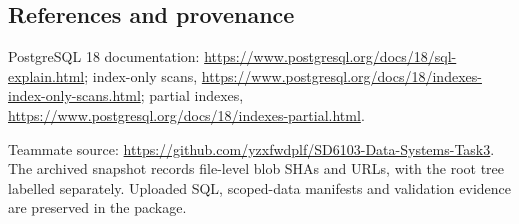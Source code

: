 \documentclass[11pt,a4paper]{article}
\begin{document}
\subsection{References and provenance}
PostgreSQL 18 documentation: \url{https://www.postgresql.org/docs/18/sql-explain.html}; index-only scans, \url{https://www.postgresql.org/docs/18/indexes-index-only-scans.html}; partial indexes, \url{https://www.postgresql.org/docs/18/indexes-partial.html}.

Teammate source: \url{https://github.com/yzxfwdplf/SD6103-Data-Systems-Task3}. The archived snapshot records file-level blob SHAs and URLs, with the root tree labelled separately. Uploaded SQL, scoped-data manifests and validation evidence are preserved in the package.
\end{document}
